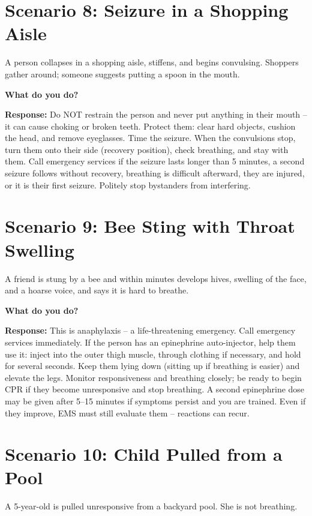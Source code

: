 \section{Scenario 8: Seizure in a Shopping Aisle}

A person collapses in a shopping aisle, stiffens, and begins convulsing. Shoppers gather around; someone suggests putting a spoon in the mouth.

\textbf{What do you do?}

\textbf{Response:} Do NOT restrain the person and never put anything in their mouth -- it can cause choking or broken teeth. Protect them: clear hard objects, cushion the head, and remove eyeglasses. Time the seizure. When the convulsions stop, turn them onto their side (recovery position), check breathing, and stay with them. Call emergency services if the seizure lasts longer than 5 minutes, a second seizure follows without recovery, breathing is difficult afterward, they are injured, or it is their first seizure. Politely stop bystanders from interfering.

\section{Scenario 9: Bee Sting with Throat Swelling}

A friend is stung by a bee and within minutes develops hives, swelling of the face, and a hoarse voice, and says it is hard to breathe.

\textbf{What do you do?}

\textbf{Response:} This is anaphylaxis -- a life-threatening emergency. Call emergency services immediately. If the person has an epinephrine auto-injector, help them use it: inject into the outer thigh muscle, through clothing if necessary, and hold for several seconds. Keep them lying down (sitting up if breathing is easier) and elevate the legs. Monitor responsiveness and breathing closely; be ready to begin CPR if they become unresponsive and stop breathing. A second epinephrine dose may be given after 5--15 minutes if symptoms persist and you are trained. Even if they improve, EMS must still evaluate them -- reactions can recur.

\section{Scenario 10: Child Pulled from a Pool}

A 5-year-old is pulled unresponsive from a backyard pool. She is not breathing.

